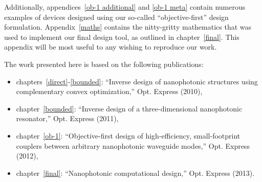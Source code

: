 Additionally, appendices~\ref{ob-1 additional} and \ref{ob-1 meta} 
    contain numerous examples of devices designed using our
    so-called ``objective-first'' design formulation.
Appendix~\ref{maths} contains the nitty-gritty mathematics
    that was used to implement our final design tool, 
    as outlined in chapter~\ref{final}.
This appendix will be most useful to any wishing to reproduce our work.

The work presented here is based on the following publications:
\begin{itemize}
\item chapters~\ref{direct}-\ref{bounded}: ``Inverse design of nanophotonic structures using complementary convex optimization,'' Opt. Express (2010),
\item chapter~\ref{bounded}:
    ``Inverse design of a three-dimensional nanophotonic resonator,''
    Opt. Express (2011), 
\item chapter~\ref{ob-1}: ``Objective-first design of high-efficiency, small-footprint couplers between arbitrary nanophotonic waveguide modes,'' 
    Opt. Express (2012),
\item chapter~\ref{final}: ``Nanophotonic computational design,'' Opt. Express (2013).
\end{itemize}


